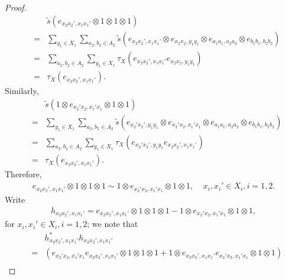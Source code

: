 \documentclass[11pt]{amsart}
\begin{document}
\begin{proof}
\begin{eqnarray*}
& &
	\tilde{s}(e_{x_{2}x_{2}', x_{1}x_{1}'}\otimes 1 \otimes 1 \otimes 1) \\
& = &
	\sum\limits_{y_{1} \in X_{1}}\sum\limits_{a_{2}, b_{2} \in A_{2}}\tilde{s}(e_{x_{2}x_{2}', x_{1}x_{1}'}\otimes e_{x_{2}x_{2}, y_{1}y_{1}}\otimes e_{a_{1}a_{1}, a_{2}a_{2}}\otimes e_{b_{1}b_{1}, b_{2}b_{2}}) \\
& = &
	\sum\limits_{a_{2}, b_{2} \in A_{2}}\sum\limits_{y_{1} \in X_{1}}\tau_{X}(e_{x_{2}x_{2}', x_{1}x_{1}'}e_{x_{2}x_{2}, y_{1}y_{1}}) \\
& = &
	\tau_{X}(e_{x_{2}x_{2}', x_{1}x_{1}'}).
\end{eqnarray*}
\noindent Similarly, 
\begin{eqnarray*}
& &
	\tilde{s}(1\otimes e_{x_{2}'x_{2}, x_{1}'x_{1}}\otimes 1\otimes 1) \\
& = &
	\sum\limits_{y_{1} \in X_{1}}\sum\limits_{a_{2}, b_{2} \in A_{2}}\tilde{s}(e_{x_{2}'x_{2}', y_{1}y_{1}}\otimes e_{x_{2}'x_{2}, x_{1}'x_{1}}\otimes e_{a_{1}a_{1}, a_{2}a_{2}}\otimes e_{b_{1}b_{1}, b_{2}b_{2}}) \\
& = &
	\sum\limits_{a_{2}, b_{2} \in A_{2}}\sum\limits_{y_{1} \in X_{1}}\tau_{X}(e_{x_{2}'x_{2}', y_{1}y_{1}}e_{x_{2}x_{2}', x_{1}x_{1}'}) \\
& = &
	\tau_{X}(e_{x_{2}x_{2}', x_{1}x_{1}'}).
\end{eqnarray*}
\noindent Therefore, 
\begin{gather*}
	e_{x_{2}x_{2}', x_{1}x_{1}'}\otimes 1 \otimes 1 \otimes 1 \sim 1\otimes e_{x_{2}'x_{2}, x_{1}'x_{1}}\otimes 1 \otimes 1, \;\;\;\; x_{i}, x_{i}' \in X_{i}, i = 1, 2.
\end{gather*}
\noindent Write 
\begin{gather*}
	h_{x_{2}x_{2}', x_{1}x_{1}'} = e_{x_{2}x_{2}', x_{1}x_{1}'}\otimes 1\otimes 1\otimes 1 - 1\otimes e_{x_{2}'x_{2}, x_{1}'x_{1}}\otimes 1\otimes 1,
\end{gather*}
\noindent for $x_{i}, x_{i}' \in X_{i}, i = 1, 2$; we note that
\begin{eqnarray*}
& &
	h_{x_{2}x_{2}', x_{1}x_{1}'}^{*}h_{x_{2}x_{2}', x_{1}x_{1}'} \\
& = &
	(e_{x_{2}'x_{2}, x_{1}'x_{1}}e_{x_{2}x_{2}', x_{1}x_{1}'}\otimes 1 \otimes 1 \otimes 1+1\otimes e_{x_{2}x_{2}', x_{1}x_{1}'}e_{x_{2}'x_{2}, x_{1}'x_{1}}\otimes 1 \otimes 1) \\

\end{eqnarray*}
\end{proof}
\end{document}
